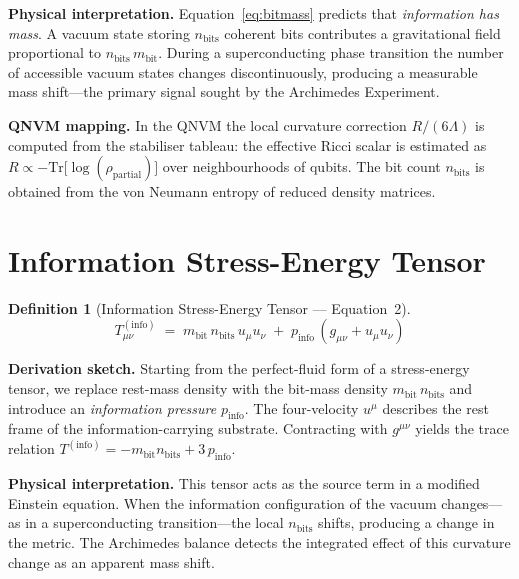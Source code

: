 \documentclass[11pt,a4paper]{article}
\newtheorem{definition}{Definition}[section]
\theoremstyle{remark}
\begin{document}
\textbf{Physical interpretation.}\quad
Equation~\eqref{eq:bitmass} predicts that \emph{information has mass}.  A vacuum state storing $n_{\text{bits}}$ coherent bits contributes a gravitational field proportional to $n_{\text{bits}}\, m_{\text{bit}}$.  During a superconducting phase transition the number of accessible vacuum states changes discontinuously, producing a measurable mass shift---the primary signal sought by the Archimedes Experiment.

\textbf{QNVM mapping.}\quad
In the QNVM the local curvature correction $R/(6\Lambda)$ is computed from the stabiliser tableau: the effective Ricci scalar is estimated as $R \propto -\text{Tr}\bigl[\log(\rho_{\text{partial}})\bigr]$ over neighbourhoods of qubits.  The bit count $n_{\text{bits}}$ is obtained from the von Neumann entropy of reduced density matrices.

\section{Information Stress-Energy Tensor}
\label{sec:eq2}

\begin{definition}[Information Stress-Energy Tensor --- Equation~2]
\begin{equation}\label{eq:infoSET}
    T_{\mu\nu}^{(\text{info})} \;=\; m_{\text{bit}}\, n_{\text{bits}}\, u_\mu u_\nu
        \;+\; p_{\text{info}}\,(g_{\mu\nu} + u_\mu u_\nu)
\end{equation}
\end{definition}

\textbf{Derivation sketch.}\quad
Starting from the perfect-fluid form of a stress-energy tensor, we replace rest-mass density with the bit-mass density $m_{\text{bit}}\, n_{\text{bits}}$ and introduce an \emph{information pressure} $p_{\text{info}}$.  The four-velocity $u^\mu$ describes the rest frame of the information-carrying substrate.  Contracting with $g^{\mu\nu}$ yields the trace relation $T^{(\text{info})} = -m_{\text{bit}} n_{\text{bits}} + 3\, p_{\text{info}}$.

\textbf{Physical interpretation.}\quad
This tensor acts as the source term in a modified Einstein equation.  When the information configuration of the vacuum changes---as in a superconducting transition---the local $n_{\text{bits}}$ shifts, producing a change in the metric.  The Archimedes balance detects the integrated effect of this curvature change as an apparent mass shift.
\end{document}
